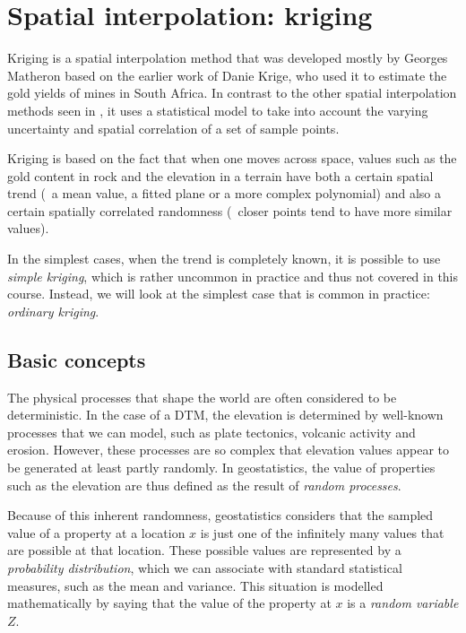 

\graphicspath{{kriging/}}

\chapter{Spatial interpolation: kriging}
\label{chap:kriging}


Kriging is a spatial interpolation method that was developed mostly by Georges Matheron based on the earlier work of Danie Krige, who used it to estimate the gold yields of mines in South Africa.
In contrast to the other spatial interpolation methods seen in , it uses a statistical model to take into account the varying uncertainty and spatial correlation of a set of sample points.

Kriging is based on the fact that when one moves across space, values such as the gold content in rock and the elevation in a terrain have both a certain spatial trend (\eg\ a mean value, a fitted plane or a more complex polynomial) and also a certain spatially correlated randomness (\ie\ closer points tend to have more similar values).

In the simplest cases, when the trend is completely known, it is possible to use \emph{simple kriging}, which is rather uncommon in practice and thus not covered in this course.
Instead, we will look at the simplest case that is common in practice: \emph{ordinary kriging}.

\section{Basic concepts}

The physical processes that shape the world are often considered to be deterministic.
In the case of a DTM, the elevation is determined by well-known processes that we can model, such as plate tectonics, volcanic activity and erosion.
However, these processes are so complex that elevation values appear to be generated at least partly randomly.
In geostatistics, the value of properties such as the elevation are thus defined as the result of \emph{random processes}.

Because of this inherent randomness, geostatistics considers that the sampled value of a property at a location \(x\) is just one of the infinitely many values that are possible at that location.
These possible values are represented by a \emph{probability distribution}, which we can associate with standard statistical measures, such as the mean and variance.
This situation is modelled mathematically by saying that the value of the property at \(x\) is a \emph{random variable} \(Z\).

